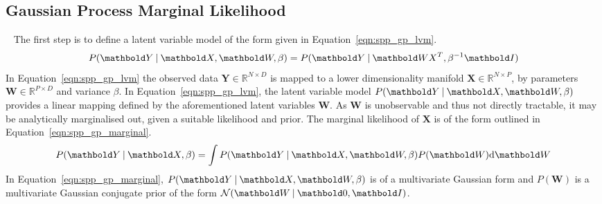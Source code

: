 \subsection{Gaussian Process Marginal Likelihood}
~\label{subsec:spp_gp_marginal_likelihood}
The first step is to define a latent variable model of the form given in Equation~\ref{eqn:spp_gp_lvm}.
\begin{equation}
  \label{eqn:spp_gp_lvm}
  P(\bm{Y} \given \bm{X}, \bm{W}, \beta) = P(\bm{Y} \given \bm{WX}^{T}, \beta^{-1}\bm{I})
\end{equation}
In Equation~\ref{eqn:spp_gp_lvm} the observed data \(\bm{Y} \in \mathbb{R}^{N \times D}\) 
is mapped to a lower dimensionality manifold \(\bm{X} \in \mathbb{R}^{N \times P}\), by parameters 
\(\bm{W} \in \mathbb{R}^{P \times D}\) and variance \( \beta \). In Equation~\ref{eqn:spp_gp_lvm}, 
the latent variable model \( P(\bm{Y} \given \bm{X}, \bm{W}, \beta) \) provides a linear mapping 
defined by the aforementioned latent variables \( \bm{W} \). As \( \bm{W} \) is unobservable and 
thus not directly tractable, it may be analytically marginalised out, given a suitable likelihood 
and prior. The marginal likelihood of \(\bm{X}\) is of the form outlined in Equation~\ref{eqn:spp_gp_marginal}.
\begin{equation}
  \label{eqn:spp_gp_marginal}
  P(\bm{Y} \given \bm{X}, \beta) = \int P(\bm{Y} \given \bm{X}, \bm{W}, \beta) P(\bm{W}) \intd{\bm{W}}
\end{equation}
In Equation~\ref{eqn:spp_gp_marginal}, \( P(\bm{Y} \given \bm{X}, \bm{W}, \beta) \) is of 
a multivariate Gaussian form and \(P(\bm{W})\) is a multivariate Gaussian conjugate prior of the 
form \(\mathcal{N}(\bm{W} \given \bm{0}, \bm{I})\).


